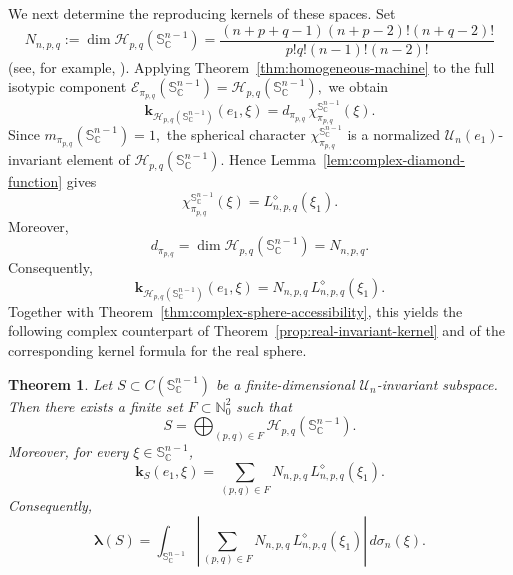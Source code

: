 \documentclass[11pt,showkeys]{amsart}
\newtheorem{theorem}{Theorem}[section]
\begin{document}
We next determine the reproducing kernels of these spaces. Set
\[
    N_{n,p,q}
    :=
    \dim\mathcal H_{p,q}(\mathbb S_{\mathbb C}^{n-1})
    =
    \frac{(n+p+q-1)(n+p-2)!(n+q-2)!}
         {p!q!(n-1)!(n-2)!}
\]
(see, for example, \cite[Equation~(5)]{defant2026ryll}).
Applying Theorem~\ref{thm:homogeneous-machine} to the full isotypic
component
\(
    \mathcal E_{\pi_{p,q}}
        (\mathbb S_{\mathbb C}^{n-1})
    =
    \mathcal H_{p,q}(\mathbb S_{\mathbb C}^{n-1}),
\)
we obtain
\[
    \mathbf k_{\mathcal H_{p,q}
        (\mathbb S_{\mathbb C}^{n-1})}(e_1,\xi)
    =
    d_{\pi_{p,q}}\,
    \chi_{\pi_{p,q}}^{\mathbb S_{\mathbb C}^{n-1}}(\xi).
\]
Since
\(
    m_{\pi_{p,q}}(\mathbb S_{\mathbb C}^{n-1})=1,
\)
the spherical character
\(\chi_{\pi_{p,q}}^{\mathbb S_{\mathbb C}^{n-1}}\) is a normalized
\(\mathcal U_n(e_1)\)-invariant element of
\(\mathcal H_{p,q}(\mathbb S_{\mathbb C}^{n-1})\). Hence
Lemma~\ref{lem:complex-diamond-function} gives
\[
    \chi_{\pi_{p,q}}^{\mathbb S_{\mathbb C}^{n-1}}(\xi)
    =
    L^\diamond_{n,p,q}(\xi_1).
\]
Moreover,
\[
    d_{\pi_{p,q}}
    =
    \dim\mathcal H_{p,q}(\mathbb S_{\mathbb C}^{n-1})
    =
    N_{n,p,q}.
\]
Consequently,
\begin{equation}
\label{eq:complex-harmonic-kernel}
    \mathbf k_{\mathcal H_{p,q}
        (\mathbb S_{\mathbb C}^{n-1})}(e_1,\xi)
    =
    N_{n,p,q}\,
    L^\diamond_{n,p,q}(\xi_1).
\end{equation}
Together with Theorem~\ref{thm:complex-sphere-accessibility}, this yields
the following complex counterpart of Theorem~\ref{prop:real-invariant-kernel}
and of the corresponding kernel formula for the real sphere.


\begin{theorem}
\label{prop:complex-sphere-kernel}
Let
\(
    S\subset C(\mathbb S_{\mathbb C}^{n-1})
\)
be a finite-dimensional \(\mathcal U_n\)-invariant subspace. Then
there exists a finite set \(F\subset\mathbb N_0^2\) such that
\[
    S
    =
    \bigoplus_{(p,q)\in F}
    \mathcal H_{p,q}(\mathbb S_{\mathbb C}^{n-1}).
\]
Moreover, for every
\(\xi\in\mathbb S_{\mathbb C}^{n-1}\),
\[
    \mathbf k_S(e_1,\xi)
    =
    \sum_{(p,q)\in F}
    N_{n,p,q}\,
    L^\diamond_{n,p,q}(\xi_1).
\]
Consequently,
\[
    \boldsymbol\lambda(S)
    =
    \int_{\mathbb S_{\mathbb C}^{n-1}}
    \left|
        \sum_{(p,q)\in F}
        N_{n,p,q}\,
        L^\diamond_{n,p,q}(\xi_1)
    \right|
    \,d\sigma_n(\xi).
\]
\end{theorem}
\end{document}
